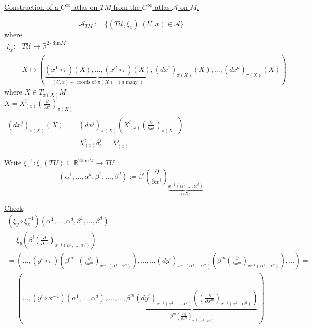 \documentclass[10pt]{amsart}
\begin{document}
\begin{multicols*}{2}
\begin{enumerate}
		\underline{Construction of a $C^{\infty}$-atlas on $TM$ from the $C^{\infty}$-atlas $\mathcal{A}$ on $M$. }
		
		\[
		\mathcal{A}_{TM} := \lbrace (T\mathcal{U},\xi_x  ) | (U,x) \in \mathcal{A} \rbrace
		\]
		where
		\[
		\begin{aligned}
		\xi_x : & T \mathcal{U} \to \mathbb{R}^{2\cdot\text{dim}  M } \\
		& X \mapsto (\underbrace{ (x^1 \circ \pi)(X), \dots, (x^d\circ \pi)(X) }_{(U,x)-\text{ coords of $\pi(X)$ } \, (d \text{ many } ) } , (dx^1)_{\pi(X)}(X), \dots , (dx^d)_{\pi(X)}(X)  )
		\end{aligned}
		\]
		where $X\in T_{\pi(X)}M$ \\
		\phantom{where } $X = X_{(x)}^i \left( \frac{ \partial }{ \partial x^i} \right)_{\pi(X)}$  \\
		\phantom{where } $\begin{aligned} \quad  & \\
		(dx^j)_{\pi(X)}(X) &= (dx^j)_{\pi(X)} \left( X^i_{(x)}\left( \frac{ \partial }{ \partial x^i} \right)_{\pi(X)} \right) = \\
		& = X^i_{(x)}\delta_i^j = X^j_{(x)}\end{aligned}$
		
		\underline{Write} $\xi_x^{-1} : \xi_x(TU) \subseteq \mathbb{R}^{2\text{dim}M} \to TU$
		\[
		(\alpha^1 , \dots , \alpha^d, \beta^1, \dots , \beta^d) := \beta^i \left( \frac{ \partial }{ \partial x^i} \right)_{ \underbrace{ x^{-1}(\alpha^1 , \dots , \alpha^d) }_{\pi(X)} }
		\]
		
		\underline{Check}: \[
		\begin{gathered}
		(\xi_y \circ \xi_x^{-1})(\alpha^1 , \dots , \alpha^d, \beta^1, \dots , \beta^d) = \\
		= \xi_y \left( \beta^i \left( \frac{ \partial }{ \partial x^i} \right)_{x^{-1}(\alpha^1 , \dots , \alpha^d) } \right) \\
		= \left( \dots, (y^i \circ \pi)( \beta^m \cdot \left( \frac{ \partial }{ \partial x^m} \right)_{x^{-1}(\alpha^1 \dots \alpha^d) } )  , \dots , \dots (dy^i)_{x^{-1}(\alpha^1, \dots \alpha^d) } \left( \beta^m \left( \frac{ \partial }{ \partial x^m} \right)_{x^{-1}(\alpha^1 \dots \alpha^d) } \right) , \dots   \right) = \\
		= ( \dots , (y^i \circ x^{-1})(\alpha^1 , \dots , \alpha^d), \dots , \dots , \underbrace{ \beta^m(dy^i)_{x^{-1} (\alpha^1, \dots , \alpha^d) } \left( \left( \frac{ \partial }{ \partial x^m} \right)_{x^{-1}(\alpha^1 \dots \alpha^d) } \right)}_{ \beta^m \left( \frac{ \partial y }{ \partial x^m } \right)_{x^{-1}(\alpha^1 \dots \alpha^d)} }  ) 
		\end{gathered}
		\]
		

\end{enumerate}
\end{multicols*}
\end{document}
